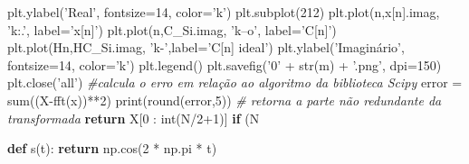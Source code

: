 \documentclass[]{article}
\newenvironment{Shaded}{}{}
\newcommand{\BuiltInTok}[1]{#1}
\newcommand{\CommentTok}[1]{\textcolor[rgb]{0.38,0.63,0.69}{\textit{#1}}}
\newcommand{\ControlFlowTok}[1]{\textcolor[rgb]{0.00,0.44,0.13}{\textbf{#1}}}
\newcommand{\DecValTok}[1]{\textcolor[rgb]{0.25,0.63,0.44}{#1}}
\newcommand{\KeywordTok}[1]{\textcolor[rgb]{0.00,0.44,0.13}{\textbf{#1}}}
\newcommand{\NormalTok}[1]{#1}
\newcommand{\OperatorTok}[1]{\textcolor[rgb]{0.40,0.40,0.40}{#1}}
\newcommand{\StringTok}[1]{\textcolor[rgb]{0.25,0.44,0.63}{#1}}
\begin{document}
\begin{Shaded}
\begin{Highlighting}[numbers=left,,]
\NormalTok{    plt.ylabel(}\StringTok{'Real'}\NormalTok{, fontsize}\OperatorTok{=}\DecValTok{14}\NormalTok{, color}\OperatorTok{=}\StringTok{'k'}\NormalTok{)    }
\NormalTok{    plt.subplot(}\DecValTok{212}\NormalTok{)}
\NormalTok{    plt.plot(n,x[n].imag, }\StringTok{'k:.'}\NormalTok{, label}\OperatorTok{=}\StringTok{'x[n]'}\NormalTok{)}
\NormalTok{    plt.plot(n,C_Si.imag, }\StringTok{'k--o'}\NormalTok{, label}\OperatorTok{=}\StringTok{'C[n]'}\NormalTok{)}
\NormalTok{    plt.plot(Hn,HC_Si.imag, }\StringTok{'k-'}\NormalTok{,label}\OperatorTok{=}\StringTok{'C[n] ideal'}\NormalTok{)}
\NormalTok{    plt.ylabel(}\StringTok{'Imaginário'}\NormalTok{, fontsize}\OperatorTok{=}\DecValTok{14}\NormalTok{, color}\OperatorTok{=}\StringTok{'k'}\NormalTok{)}
\NormalTok{    plt.legend()}
\NormalTok{    plt.savefig(}\StringTok{'0'} \OperatorTok{+} \BuiltInTok{str}\NormalTok{(m) }\OperatorTok{+} \StringTok{'.png'}\NormalTok{, dpi}\OperatorTok{=}\DecValTok{150}\NormalTok{)}
\NormalTok{    plt.close(}\StringTok{'all'}\NormalTok{)}
  \CommentTok{#calcula o erro em relação ao algoritmo da biblioteca Scipy}
\NormalTok{  error }\OperatorTok{=} \BuiltInTok{sum}\NormalTok{((X}\OperatorTok{-}\NormalTok{fft(x))}\OperatorTok{**}\DecValTok{2}\NormalTok{)}
  \BuiltInTok{print}\NormalTok{(}\BuiltInTok{round}\NormalTok{(error,}\DecValTok{5}\NormalTok{))}
  \CommentTok{# retorna a parte não redundante da transformada}
  \ControlFlowTok{return}\NormalTok{ X[}\DecValTok{0}\NormalTok{ : }\BuiltInTok{int}\NormalTok{(N}\OperatorTok{/}\DecValTok{2}\OperatorTok{+}\DecValTok{1}\NormalTok{)] }\ControlFlowTok{if}\NormalTok{ (N }\OperatorTok{%

\KeywordTok{def}\NormalTok{ s(t):}
  \ControlFlowTok{return}\NormalTok{ np.cos(}\DecValTok{2} \OperatorTok{*}\NormalTok{ np.pi }\OperatorTok{*}\NormalTok{ t)}

}
\end{Highlighting}
\end{Shaded}
\end{document}
